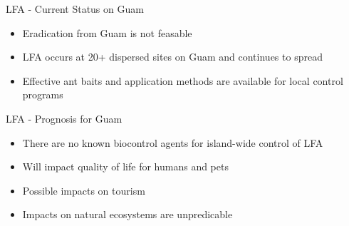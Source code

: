 \documentclass[]{beamer}
\begin{document}
\begin{frame}{LFA - Current Status on Guam}
	\begin{itemize}
		\item Eradication from Guam is not feasable
		\item LFA occurs at 20+ dispersed sites on Guam and continues to spread
		\item Effective ant baits and application methods are available for local control programs
	\end{itemize}
\end{frame}

\begin{frame}{LFA - Prognosis for Guam}
	\begin{itemize}
		\item There are no known biocontrol agents for island-wide control of LFA
		\item Will impact quality of life for humans and pets
		\item Possible impacts on tourism
		\item Impacts on natural ecosystems are unpredicable
	\end{itemize}
\end{frame}


\begin{frame}{}
\end{frame}
\end{document}

